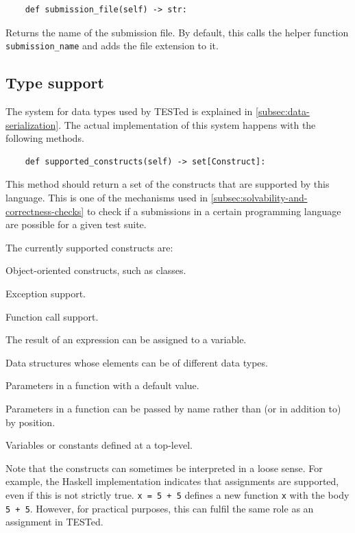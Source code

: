 \documentclass[../main]{subfiles}
\begin{document}
\begin{verbatim}
    def submission_file(self) -> str:
\end{verbatim}

Returns the name of the submission file.
By default, this calls the helper function \texttt{submission_name} and adds the file extension to it.

\subsection{Type support}\label{subsec:type-support}

The system for data types used by TESTed is explained in \cref{subsec:data-serialization}.
The actual implementation of this system happens with the following methods.

\begin{verbatim}
    def supported_constructs(self) -> set[Construct]:
\end{verbatim}

This method should return a set of the constructs that are supported by this language.
This is one of the mechanisms used in \cref{subsec:solvability-and-correctness-checks} to check if a submissions in a certain programming language are possible for a given test suite.

The currently supported constructs are:

\begin{description}[noitemsep]
    \item[Objects] Object-oriented constructs, such as classes.
    \item[Exceptions] Exception support.
    \item[Function calls] Function call support.
    \item[Assignments] The result of an expression can be assigned to a variable.
    \item[Heterogeneous collections] Data structures whose elements can be of different data types.
    \item[Default parameters] Parameters in a function with a default value.
    \item[Named parameters] Parameters in a function can be passed by name rather than (or in addition to) by position.
    \item[Global variables] Variables or constants defined at a top-level.
\end{description}

Note that the constructs can sometimes be interpreted in a loose sense.
For example, the Haskell implementation indicates that assignments are supported, even if this is not strictly true.
\texttt{x = 5 + 5} defines a new function \texttt{x} with the body \texttt{5 + 5}.
However, for practical purposes, this can fulfil the same role as an assignment in TESTed.
\end{document}
